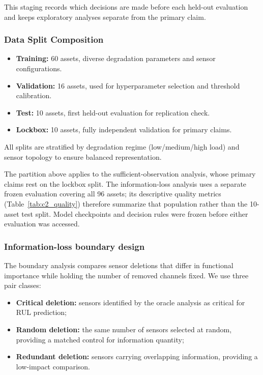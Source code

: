 This staging records which decisions are made before each held-out evaluation and keeps exploratory analyses separate from the primary claim.

\subsubsection{Data Split Composition}

\begin{itemize}
    \item \textbf{Training:} 60 assets, diverse degradation parameters and sensor configurations.
    \item \textbf{Validation:} 16 assets, used for hyperparameter selection and threshold calibration.
    \item \textbf{Test:} 10 assets, first held-out evaluation for replication check.
    \item \textbf{Lockbox:} 10 assets, fully independent validation for primary claims.
\end{itemize}

All splits are stratified by degradation regime (low/medium/high load) and sensor topology to ensure balanced representation.

The partition above applies to the sufficient-observation analysis, whose primary claims rest on the lockbox split. The information-loss analysis uses a separate frozen evaluation covering all 96 assets; its descriptive quality metrics (Table~\ref{tab:c2_quality}) therefore summarize that population rather than the 10-asset test split. Model checkpoints and decision rules were frozen before either evaluation was accessed.

\subsubsection{Information-loss boundary design}

The boundary analysis compares sensor deletions that differ in functional importance
while holding the number of removed channels fixed. We use three pair classes:
\begin{itemize}
    \item \textbf{Critical deletion:} sensors identified by the oracle analysis as critical for RUL prediction;
    \item \textbf{Random deletion:} the same number of sensors selected at random, providing a matched control for information quantity;
    \item \textbf{Redundant deletion:} sensors carrying overlapping information, providing a low-impact comparison.
\end{itemize}

